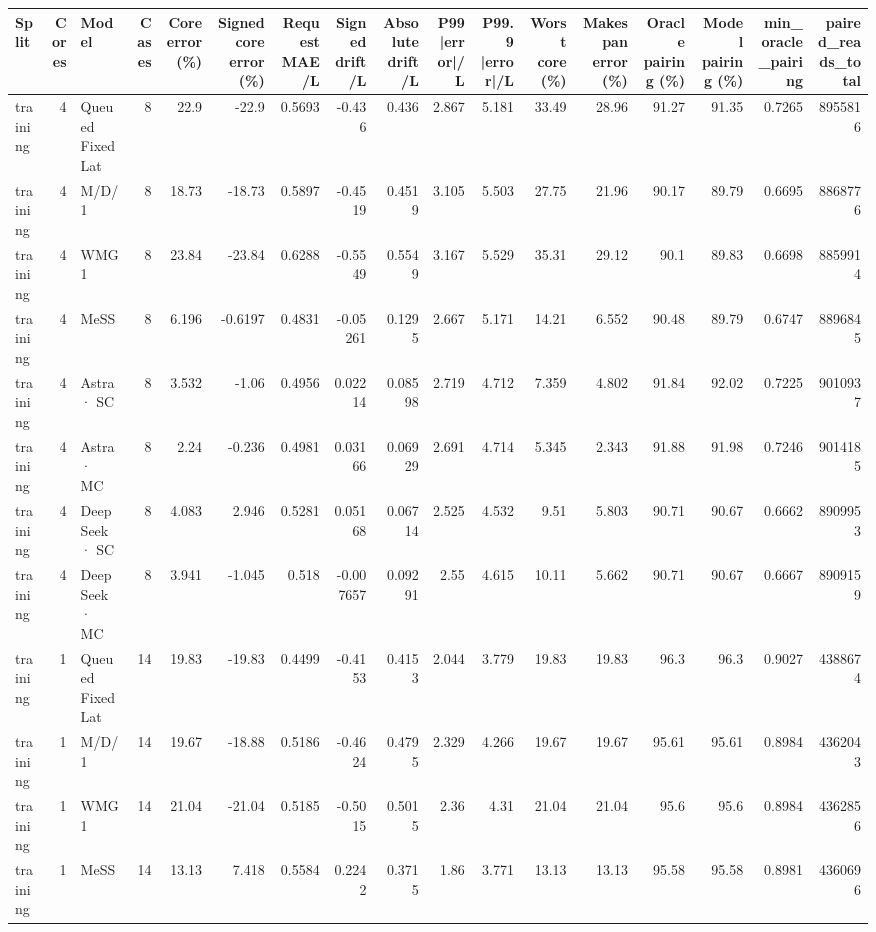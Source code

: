 \begin{tabular}{lrlrrrrrrrrrrrrrr}
\toprule
Split & Cores & Model & Cases & Core error (\%) & Signed core error (\%) & Request MAE/L & Signed drift/L & Absolute drift/L & P99 |error|/L & P99.9 |error|/L & Worst core (\%) & Makespan error (\%) & Oracle pairing (\%) & Model pairing (\%) & min\_oracle\_pairing & paired\_reads\_total \\
\midrule
training & 4 & Queued FixedLat & 8 & 22.9 & -22.9 & 0.5693 & -0.436 & 0.436 & 2.867 & 5.181 & 33.49 & 28.96 & 91.27 & 91.35 & 0.7265 & 8955816 \\
training & 4 & M/D/1 & 8 & 18.73 & -18.73 & 0.5897 & -0.4519 & 0.4519 & 3.105 & 5.503 & 27.75 & 21.96 & 90.17 & 89.79 & 0.6695 & 8868776 \\
training & 4 & WMG1 & 8 & 23.84 & -23.84 & 0.6288 & -0.5549 & 0.5549 & 3.167 & 5.529 & 35.31 & 29.12 & 90.1 & 89.83 & 0.6698 & 8859914 \\
training & 4 & MeSS & 8 & 6.196 & -0.6197 & 0.4831 & -0.05261 & 0.1295 & 2.667 & 5.171 & 14.21 & 6.552 & 90.48 & 89.79 & 0.6747 & 8896845 \\
training & 4 & Astra · SC & 8 & 3.532 & -1.06 & 0.4956 & 0.02214 & 0.08598 & 2.719 & 4.712 & 7.359 & 4.802 & 91.84 & 92.02 & 0.7225 & 9010937 \\
training & 4 & Astra · MC & 8 & 2.24 & -0.236 & 0.4981 & 0.03166 & 0.06929 & 2.691 & 4.714 & 5.345 & 2.343 & 91.88 & 91.98 & 0.7246 & 9014185 \\
training & 4 & DeepSeek · SC & 8 & 4.083 & 2.946 & 0.5281 & 0.05168 & 0.06714 & 2.525 & 4.532 & 9.51 & 5.803 & 90.71 & 90.67 & 0.6662 & 8909953 \\
training & 4 & DeepSeek · MC & 8 & 3.941 & -1.045 & 0.518 & -0.007657 & 0.09291 & 2.55 & 4.615 & 10.11 & 5.662 & 90.71 & 90.67 & 0.6667 & 8909159 \\
training & 1 & Queued FixedLat & 14 & 19.83 & -19.83 & 0.4499 & -0.4153 & 0.4153 & 2.044 & 3.779 & 19.83 & 19.83 & 96.3 & 96.3 & 0.9027 & 4388674 \\
training & 1 & M/D/1 & 14 & 19.67 & -18.88 & 0.5186 & -0.4624 & 0.4795 & 2.329 & 4.266 & 19.67 & 19.67 & 95.61 & 95.61 & 0.8984 & 4362043 \\
training & 1 & WMG1 & 14 & 21.04 & -21.04 & 0.5185 & -0.5015 & 0.5015 & 2.36 & 4.31 & 21.04 & 21.04 & 95.6 & 95.6 & 0.8984 & 4362856 \\
training & 1 & MeSS & 14 & 13.13 & 7.418 & 0.5584 & 0.2242 & 0.3715 & 1.86 & 3.771 & 13.13 & 13.13 & 95.58 & 95.58 & 0.8981 & 4360696 \\

\end{tabular}
